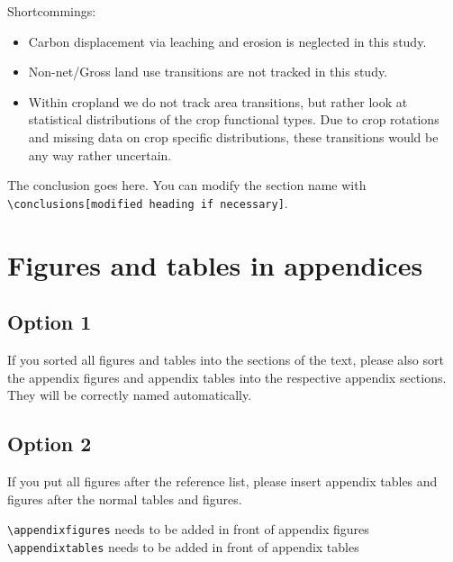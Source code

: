 \documentclass[gc, manuscript]{copernicus}
\begin{document}
Shortcommings:

\begin{itemize}
\item
  Carbon displacement via leaching and erosion is neglected in this
  study.
\item
  Non-net/Gross land use transitions are not tracked in this study.
\item
  Within cropland we do not track area transitions, but rather look at
  statistical distributions of the crop functional types. Due to crop
  rotations and missing data on crop specific distributions, these
  transitions would be any way rather uncertain. \newpage
\end{itemize}

\conclusions

The conclusion goes here. You can modify the section name with
\texttt{\textbackslash{}conclusions{[}modified\ heading\ if\ necessary{]}}.
\newpage








\appendix
\section{Figures and tables in appendices}
\subsection{Option 1}

If you sorted all figures and tables into the sections of the text,
please also sort the appendix figures and appendix tables into the
respective appendix sections. They will be correctly named
automatically.

\subsection{Option 2}

If you put all figures after the reference list, please insert appendix
tables and figures after the normal tables and figures.

\texttt{\textbackslash{}appendixfigures} needs to be added in front of
appendix figures \texttt{\textbackslash{}appendixtables} needs to be
added in front of appendix tables
\end{document}
